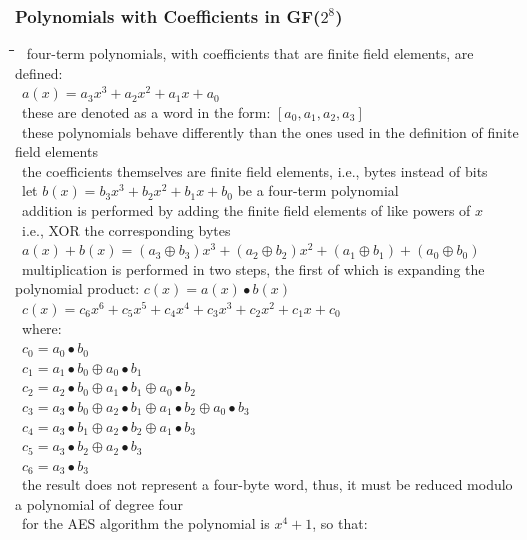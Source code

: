 \documentclass[10pt,letterpaper]{scrartcl}
\newcommand{\tbul}{\textbullet}
\newcommand{\tend}{\>\textendash}
\newcommand{\tabDef}{\hspace{2em}\=\hspace{2em}\=\hspace{2em}\=\hspace{2em}\=\kill}
\begin{document}
\subsubsection*{Polynomials with Coefficients in GF($2^8$)}\begin{tabbing}\tabDef 
\tbul\ four-term polynomials, with coefficients that are finite field elements, are defined: \\
\>\>\>\ $a(x)=a_3x^3+a_2x^2+a_1x+a_0$ \\
\tbul\ these are denoted as a word in the form: $[a_0, a_1, a_2, a_3]$ \\
\tbul\ these polynomials behave differently than the ones used in the definition of finite field elements\\
    \tend\ the coefficients themselves are finite field elements, i.e., bytes instead of bits\\
\tbul\ let $b(x)=b_3x^3+b_2x^2+b_1x+b_0$ be a four-term polynomial \\
    \tend\ addition is performed by adding the finite field elements of like powers of $x$\\
    \tend\ i.e., XOR the corresponding bytes \\
\>\>\>\>\ $a(x)+b(x)=(a_3\oplus b_3)x^3+(a_2\oplus b_2)x^2+(a_1\oplus b_1)+(a_0\oplus b_0)$ \\
\tbul\ multiplication is performed in two steps, the first of which is expanding the polynomial product: $c(x)=a(x)\bullet b(x)$\\
\>\>\>\>\ $c(x)=c_6x^6+c_5x^5+c_4x^4+c_3x^3+c_2x^2+c_1x+c_0$ \\
    \tend\ where: \\
\>\>\>\>\ $c_0 = a_0\bullet b_0$\\
\>\>\>\>\ $c_1=a_1\bullet b_0\oplus a_0\bullet b_1$\\
\>\>\>\>\ $c_2 = a_2\bullet b_0\oplus a_1\bullet b_1\oplus a_0\bullet b_2$\\
\>\>\>\>\ $c_3 = a_3\bullet b_0\oplus a_2\bullet b_1\oplus a_1\bullet b_2\oplus a_0\bullet b_3$\\
\>\>\>\>\ $c_4 = a_3\bullet b_1\oplus a_2\bullet b_2\oplus a_1\bullet b_3$ \\
\>\>\>\>\ $c_5 = a_3\bullet b_2\oplus a_2\bullet b_3$ \\
\>\>\>\>\ $c_6 = a_3\bullet b_3$ \\
    \tend\ the result does not represent a four-byte word, thus, it must be reduced modulo a polynomial of degree four \\
    \tend\ for the AES algorithm the polynomial is $x^4+1$, so that: \\

\end{tabbing}
\end{document}
